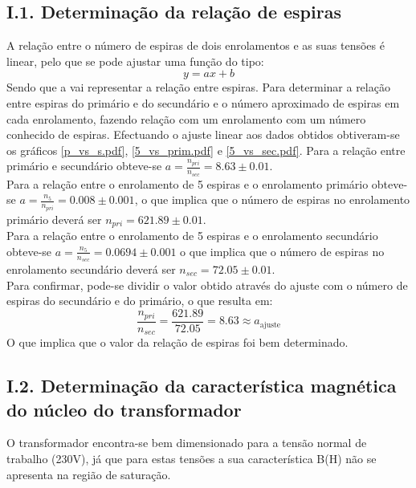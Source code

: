 \documentclass[%
  reprint,
  nofootinbib,
  amsmath,amssymb,
  aps,
  10pt,
]{revtex4-1}
\begin{document}
\subsection*{I.1. Determinação da relação de espiras}
A relação entre o número de espiras de dois enrolamentos e as suas tensões é linear, pelo que se pode ajustar uma função do tipo:
\begin{equation}
y=ax+b
\end{equation}
Sendo que a vai representar a relação entre espiras. Para determinar a relação entre espiras do primário e do secundário e o número aproximado de espiras em cada enrolamento, fazendo relação com um enrolamento com um número conhecido de espiras.
Efectuando o ajuste linear aos dados obtidos obtiveram-se os gráficos \ref{p_vs_s.pdf}, \ref{5_vs_prim.pdf} e \ref{5_vs_sec.pdf}.
Para a relação entre primário e secundário obteve-se $a=\frac{n_{pri}}{n_{sec}}=8.63\pm0.01$.\\
Para a relação entre o enrolamento de 5 espiras e o enrolamento primário obteve-se $a=\frac{n_{5}}{n_{pri}}=0.008\pm0.001$, o que implica que o número de espiras no enrolamento primário deverá ser $n_{pri}=621.89\pm0.01$.\\
Para a relação entre o enrolamento de 5 espiras e o enrolamento secundário obteve-se  $a=\frac{n_{5}}{n_{sec}}=0.0694\pm0.001$ o que implica que o número de espiras no enrolamento secundário deverá ser $n_{sec}=72.05\pm0.01$.\\
Para confirmar, pode-se dividir o valor obtido através do ajuste com o número de espiras do secundário e do primário, o que resulta em:
\begin{equation}
\frac{n_{pri}}{n_{sec}}=\frac{621.89}{72.05}=8.63\approx a_{\mathrm{ajuste}}
\end{equation}
 O que implica que o valor da relação de espiras foi bem determinado.

\subsection*{I.2. Determinação da característica magnética do núcleo do transformador}
O transformador encontra-se bem dimensionado para a tensão normal de trabalho (230V), já que para estas tensões a sua característica B(H) não se apresenta na região de saturação.
\end{document}
